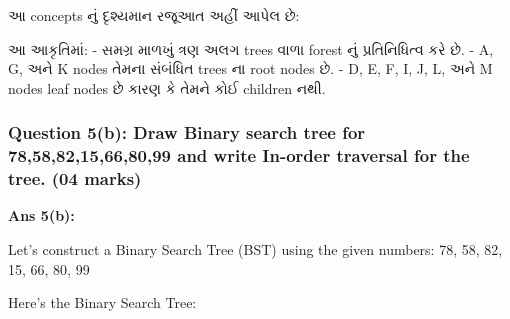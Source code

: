 આ concepts નું દૃશ્યમાન રજૂઆત અહીં આપેલ છે:

\begin{Shaded}
\begin{Highlighting}[]
    
    
\end{Highlighting}
\end{Shaded}

આ આકૃતિમાં: - સમગ્ર માળખું ત્રણ અલગ trees વાળા forest નું પ્રતિનિધિત્વ કરે છે. - A,
G, અને K nodes તેમના સંબંધિત trees ના root nodes છે. - D, E, F, I, J, L, અને M
nodes leaf nodes છે કારણ કે તેમને કોઈ children નથી.

\hypertarget{question-5b-draw-binary-search-tree-for-78588215668099-and-write-in-order-traversal-for-the-tree.-04-marks}{%
\subsubsection{Question 5(b): Draw Binary search tree for
78,58,82,15,66,80,99 and write In-order traversal for the tree. (04
marks)}\label{question-5b-draw-binary-search-tree-for-78588215668099-and-write-in-order-traversal-for-the-tree.-04-marks}}

\textbf{Ans 5(b):}

Let's construct a Binary Search Tree (BST) using the given numbers: 78,
58, 82, 15, 66, 80, 99

Here's the Binary Search Tree:

\begin{Shaded}
\begin{Highlighting}[]
\end{Highlighting}
\end{Shaded}

